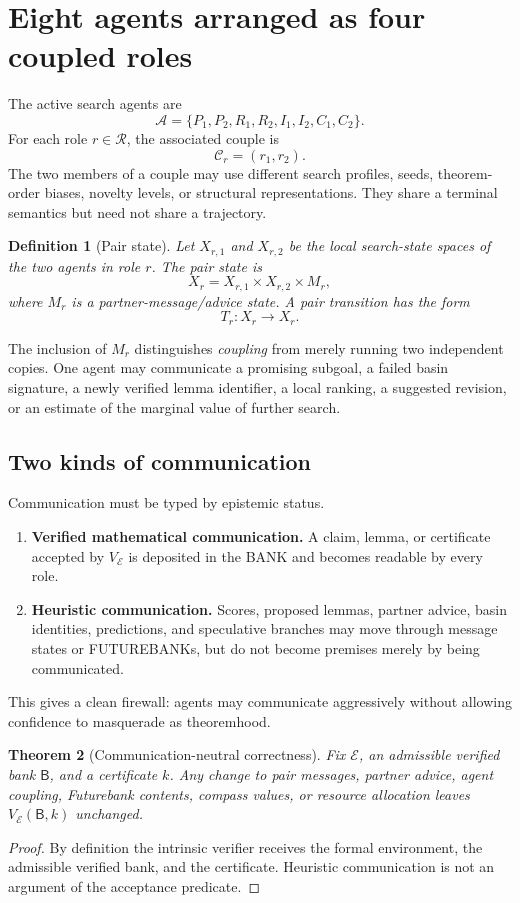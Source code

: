 \documentclass[11pt]{article}
\newtheorem{theorem}{Theorem}[section]
\newtheorem{definition}[theorem]{Definition}
\newcommand{\Bank}{\mathsf{B}}
\newcommand{\Env}{\mathcal{E}}
\newcommand{\Verify}{V_{\Env}}
\newcommand{\Agents}{\mathcal{A}}
\begin{document}
\section{Eight agents arranged as four coupled roles}

The active search agents are
\[
\Agents=\{P_1,P_2,R_1,R_2,I_1,I_2,C_1,C_2\}.
\]
For each role $r\in\mathcal R$, the associated couple is
\[
\mathcal C_r=(r_1,r_2).
\]
The two members of a couple may use different search profiles, seeds, theorem-order biases, novelty levels, or structural representations. They share a terminal semantics but need not share a trajectory.

\begin{definition}[Pair state]
Let $X_{r,1}$ and $X_{r,2}$ be the local search-state spaces of the two agents in role $r$. The pair state is
\[
X_r=X_{r,1}\times X_{r,2}\times M_r,
\]
where $M_r$ is a partner-message/advice state. A pair transition has the form
\[
T_r:X_r\to X_r.
\]
\end{definition}

The inclusion of $M_r$ distinguishes \emph{coupling} from merely running two independent copies. One agent may communicate a promising subgoal, a failed basin signature, a newly verified lemma identifier, a local ranking, a suggested revision, or an estimate of the marginal value of further search.

\subsection{Two kinds of communication}

Communication must be typed by epistemic status.

\begin{enumerate}[label=(\alph*)]
\item \textbf{Verified mathematical communication.} A claim, lemma, or certificate accepted by $V_{\Env}$ is deposited in the BANK and becomes readable by every role.
\item \textbf{Heuristic communication.} Scores, proposed lemmas, partner advice, basin identities, predictions, and speculative branches may move through message states or FUTUREBANKs, but do not become premises merely by being communicated.
\end{enumerate}

This gives a clean firewall: agents may communicate aggressively without allowing confidence to masquerade as theoremhood.

\begin{theorem}[Communication-neutral correctness]
Fix $\Env$, an admissible verified bank $\Bank$, and a certificate $k$. Any change to pair messages, partner advice, agent coupling, Futurebank contents, compass values, or resource allocation leaves $\Verify(\Bank,k)$ unchanged.
\end{theorem}
\begin{proof}
By definition the intrinsic verifier receives the formal environment, the admissible verified bank, and the certificate. Heuristic communication is not an argument of the acceptance predicate.
\end{proof}
\end{document}
